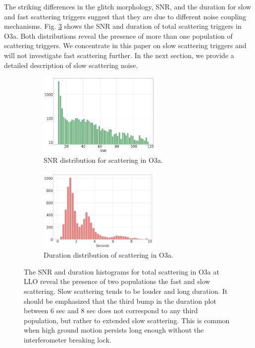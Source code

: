 \documentclass[12pt]{iopart}
\begin{document}
 The striking differences in the glitch morphology, SNR, and the duration for slow and fast scattering triggers suggest that they are due to different noise coupling mechanisms. Fig. \ref{fig:snrdur} shows the SNR and duration of total scattering triggers in O3a. Both distributions reveal the presence of more than one population of scattering triggers. We concentrate in this paper on slow scattering triggers and will not investigate fast scattering further. In the next section, we provide a detailed description of slow scattering noise.
\begin{figure}[h]
\captionsetup[subfigure]{font=scriptsize,labelfont=scriptsize}
   \centering
    \begin{subfigure}[b]{0.45\textwidth}
        \centering
         \includegraphics[width= 6cm]{histsnr4d.png}
         \caption{SNR distribution for scattering in O3a.}
         \label{fig:histsnr}
    \end{subfigure}
    \hfill
    \begin{subfigure}[b]{0.5\textwidth}
        \centering
         \includegraphics[width =6cm]{histdur4c.png}
         \caption{ Duration distribution of scattering in O3a.}
         \label{fig:histdur}
         
    
    \end{subfigure}
    \caption{The SNR and duration histograms for total scattering in O3a at LLO reveal the presence of two populations the fast and slow scattering. Slow scattering tends to be louder and long duration. It should be emphasized that the third bump in the duration plot between 6 sec and 8 sec does not correspond to any third population, but rather to extended slow scattering. This is common when high ground motion persists long enough without the interferometer breaking lock.}
    \label{fig:snrdur}
    
\end{figure}
\end{document}
